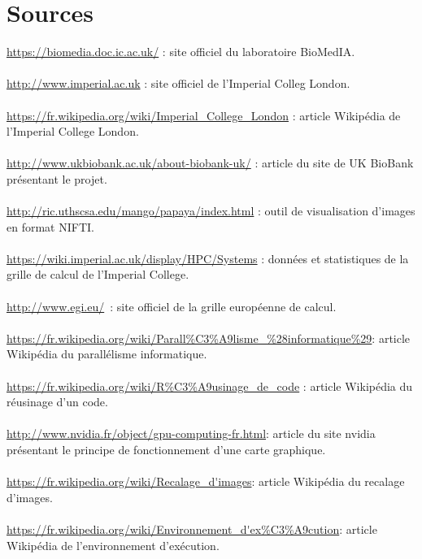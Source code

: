 \documentclass[10pt]{report}
\begin{document}
\chapter*{Sources}
\noindent
\url{https://biomedia.doc.ic.ac.uk/}  : site officiel du laboratoire BioMedIA. \\
\\
\url{http://www.imperial.ac.uk} : site officiel de l'Imperial Colleg London.\\
\\
\url{https://fr.wikipedia.org/wiki/Imperial_College_London} : article Wikipédia de l'Imperial College London.\\
\\
\url{http://www.ukbiobank.ac.uk/about-biobank-uk/} : article du site de UK BioBank présentant le projet.\\
\\
\url{http://ric.uthscsa.edu/mango/papaya/index.html} : outil de visualisation d'images en format NIFTI.\\
\\
\url{https://wiki.imperial.ac.uk/display/HPC/Systems} : données et statistiques de la grille de calcul de l'Imperial College.\\
\\
\url{http://www.egi.eu/} : site officiel de la grille européenne de calcul.\\
\\
\url{https://fr.wikipedia.org/wiki/Parall\%C3\%A9lisme_\%28informatique\%29}: article Wikipédia du parallélisme informatique.\\
\\
\url{https://fr.wikipedia.org/wiki/R\%C3\%A9usinage_de_code} : article Wikipédia du réusinage d'un code. \\
\\
\url{http://www.nvidia.fr/object/gpu-computing-fr.html}: article du site nvidia présentant le principe de fonctionnement d'une carte graphique.\\
\\
\url{https://fr.wikipedia.org/wiki/Recalage_d'images}: article Wikipédia du recalage d'images.\\
\\
\url{https://fr.wikipedia.org/wiki/Environnement_d'ex\%C3\%A9cution}: article Wikipédia de l'environnement d'exécution.\\
\\

\renewcommand{\listfigurename}{Table des illustations}\listoffigures 
{}
\end{document}
